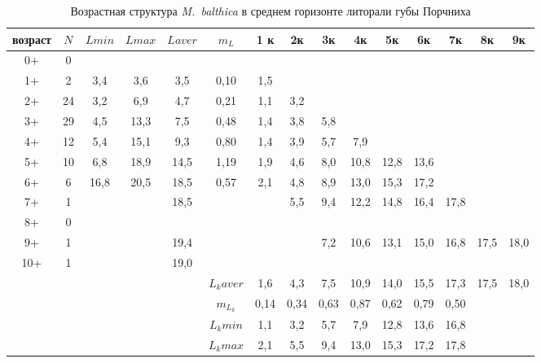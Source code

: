 \begin{landscape}
\begin{table}[h]
\caption{Возрастная структура {\it M.~balthica} в среднем горизонте литорали губы Порчниха}
\label{tab:Porchnikha_sgl_growth_matrix}
\begin{tabular}{|c|c|cc|cc|ccccccccc|}
    \hline
    возраст & $N$  & $L min$ & $L max$ & $L aver$ & $m_L$    & 1 к  & 2к   & 3к   & 4к   & 5к   & 6к   & 7к   & 8к   & 9к   \\ \hline
0+      & 0  &       &       &         &         &      &      &      &      &      &      &      &      &      \\
1+      & 2  & 3,4   & 3,6   & 3,5     & 0,10    & 1,5  &      &      &      &      &      &      &      &      \\
2+      & 24 & 3,2   & 6,9   & 4,7     & 0,21    & 1,1  & 3,2  &      &      &      &      &      &      &      \\
3+      & 29 & 4,5   & 13,3  & 7,5     & 0,48    & 1,4  & 3,8  & 5,8  &      &      &      &      &      &      \\
4+      & 12 & 5,4   & 15,1  & 9,3     & 0,80    & 1,4  & 3,9  & 5,7  & 7,9  &      &      &      &      &      \\
5+      & 10 & 6,8   & 18,9  & 14,5    & 1,19    & 1,9  & 4,6  & 8,0  & 10,8 & 12,8 & 13,6 &      &      &      \\
6+      & 6  & 16,8  & 20,5  & 18,5    & 0,57    & 2,1  & 4,8  & 8,9  & 13,0 & 15,3 & 17,2 &      &      &      \\
7+      & 1  &     &     & 18,5    &         &    & 5,5  & 9,4  & 12,2 & 14,8 & 16,4 & 17,8 &      &      \\
8+      & 0  &       &       &         &         &      &      &      &      &      &      &      &      &      \\
9+      & 1  &     &     & 19,4    &         &    &    & 7,2  & 10,6 & 13,1 & 15,0 & 16,8 & 17,5 & 18,0 \\
10+     & 1  &     &     & 19,0    &         &    &    &    &    &    &    &    &    &    \\ \hline
        &    &       &       &         & $L_k aver$ & 1,6  & 4,3  & 7,5  & 10,9 & 14,0 & 15,5 & 17,3 & 17,5 & 18,0 \\ 
        &    &       &       &         & $m_{L_k}$  & 0,14 & 0,34 & 0,63 & 0,87 & 0,62 & 0,79 & 0,50 &      &      \\
        &    &       &       &         & $L_k min$  & 1,1  & 3,2  & 5,7  & 7,9  & 12,8 & 13,6 & 16,8 &    &    \\
        &    &       &       &         & $L_k max$  & 2,1  & 5,5  & 9,4  & 13,0 & 15,3 & 17,2 & 17,8 &    &    \\ \hline
\end{tabular}
\end{table}

\end{landscape}

